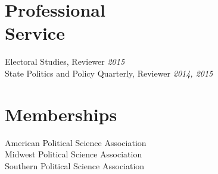 \documentclass[margin,line]{res}
\begin{document}
\begin{resume}
\section{\sc Professional \\Service}
Electoral Studies, Reviewer \hfill \emph{2015}\\
State Politics and Policy Quarterly, Reviewer \hfill \emph{2014, 2015} \\

\section{\sc Memberships}
American Political Science Association \\
Midwest Political Science Association \\
Southern Political Science Association \\


\end{resume}
\end{document}
